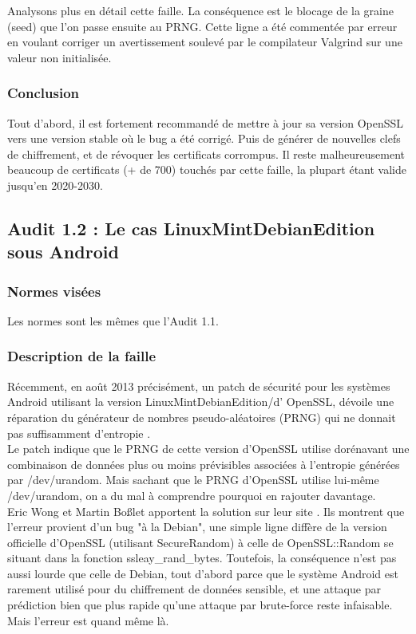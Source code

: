 			Analysons plus en détail cette faille. La conséquence est le blocage de la graine (seed) que l'on passe ensuite au PRNG. Cette ligne a été commentée par erreur en voulant corriger un avertissement soulevé par le compilateur Valgrind sur une valeur non initialisée.

		\subsubsection{Conclusion}
		
			Tout d'abord, il est fortement recommandé de mettre à jour sa version OpenSSL vers une version stable où le bug a été corrigé. Puis de générer de nouvelles clefs de chiffrement, et de révoquer les certificats corrompus. Il reste malheureusement beaucoup de certificats (+ de 700) touchés par cette faille, la plupart étant valide jusqu'en 2020-2030.
			
	\subsection{Audit 1.2 : Le cas LinuxMintDebianEdition sous Android}
		\subsubsection{Normes visées}
	
			Les normes sont les mêmes que l'Audit 1.1.
		
		\subsubsection{Description de la faille}
		
			Récemment, en août 2013 précisément, un patch de sécurité pour les systèmes Android utilisant la version LinuxMintDebianEdition/d' OpenSSL, dévoile une réparation du générateur de nombres pseudo-aléatoires (PRNG) qui ne donnait pas suffisamment d'entropie \cite{alex2013android} \cite{bochum2013randomly}. \\ 

			Le patch indique que le PRNG de cette version d'OpenSSL utilise dorénavant une combinaison de données plus ou moins prévisibles associées à l'entropie générées par /dev/urandom. Mais sachant que le PRNG d'OpenSSL utilise lui-même /dev/urandom, on a du mal à comprendre pourquoi en rajouter davantage.\\
		
			Eric Wong et Martin Boßlet apportent la solution sur leur site \cite{boblet2013android}. Ils montrent que l'erreur provient d'un bug "à la Debian", une simple ligne diffère de la version officielle d'OpenSSL (utilisant SecureRandom) à celle de OpenSSL::Random se situant dans la fonction ssleay\_rand\_bytes. Toutefois, la conséquence n'est pas aussi lourde que celle de Debian, tout d'abord parce que le système Android est rarement utilisé pour du chiffrement de données sensible, et une attaque par prédiction bien que plus rapide qu'une attaque par brute-force reste infaisable. Mais l'erreur est quand même là. \\
	
